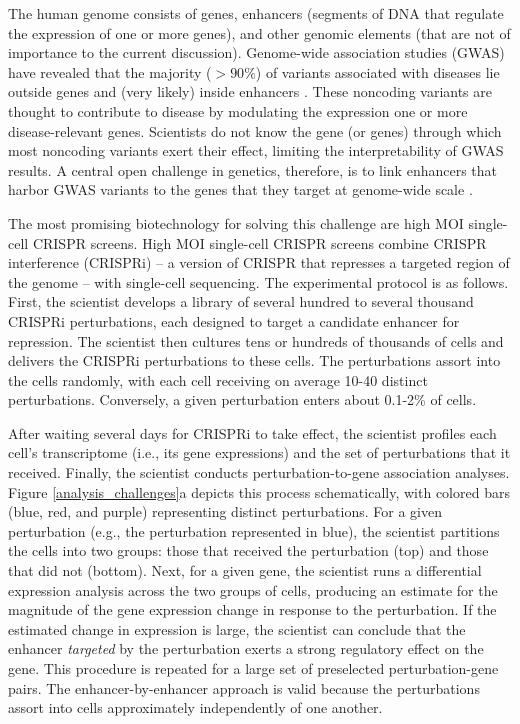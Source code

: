 \documentclass[12pt]{article}
\begin{document}
The human genome consists of genes, enhancers (segments of DNA that regulate the expression of one or more genes), and other genomic elements (that are not of importance to the current discussion). Genome-wide association studies (GWAS) have revealed that the majority ($>90\%$) of variants associated with diseases lie outside genes and (very likely) inside enhancers \cite{Gallagher2018}. These noncoding variants are thought to contribute to disease by modulating the expression one or more disease-relevant genes. Scientists do not know the gene (or genes) through which most noncoding variants exert their effect, limiting the interpretability of GWAS results. A central open challenge in genetics, therefore, is to link enhancers that harbor GWAS variants to the genes that they target at genome-wide scale \cite{Gasperini2020}.

The most promising biotechnology for solving this challenge are high MOI single-cell CRISPR screens. High MOI single-cell CRISPR screens combine CRISPR interference (CRISPRi) -- a version of CRISPR that represses a targeted region of the genome -- with single-cell sequencing. The experimental protocol is as follows. First, the scientist develops a library of several hundred to several thousand CRISPRi perturbations, each designed to target a candidate enhancer for repression. The scientist then cultures tens or hundreds of thousands of cells and delivers the CRISPRi perturbations to these cells. The perturbations assort into the cells randomly, with each cell receiving on average 10-40 distinct perturbations. Conversely, a given perturbation enters about 0.1-2\% of cells. 

After waiting several days for CRISPRi to take effect, the scientist profiles each cell's transcriptome (i.e., its gene expressions) and the set of perturbations that it received. Finally, the scientist conducts perturbation-to-gene association analyses. Figure \ref{analysis_challenges}a depicts this process schematically, with colored bars (blue, red, and purple) representing distinct perturbations. For a given perturbation (e.g., the perturbation represented in blue), the scientist partitions the cells into two groups: those that received the perturbation (top) and those that did not (bottom). Next, for a given gene, the scientist runs a differential expression analysis across the two groups of cells, producing an estimate for the magnitude of the gene expression change in response to the perturbation. If the estimated change in expression is large, the scientist can conclude that the enhancer \textit{targeted} by the perturbation exerts a strong regulatory effect on the gene. This procedure is repeated for a large set of preselected perturbation-gene pairs. The enhancer-by-enhancer approach is valid because the perturbations assort into cells approximately independently of one another.
\end{document}
